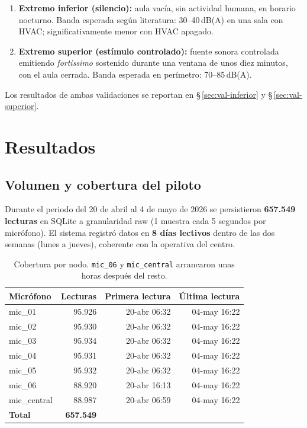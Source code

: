 \documentclass[11pt,a4paper,openany]{report}
\begin{document}
\begin{enumerate}
    \item \textbf{Extremo inferior (silencio):} aula vac\'ia, sin actividad humana, en horario nocturno. Banda esperada seg\'un literatura: 30--40\,dB(A) en una sala con HVAC; significativamente menor con HVAC apagado.
    \item \textbf{Extremo superior (est\'imulo controlado):} fuente sonora controlada emitiendo \emph{fortissimo} sostenido durante una ventana de unos diez minutos, con el aula cerrada. Banda esperada en perímetro: 70--85\,dB(A).
\end{enumerate}

Los resultados de ambas validaciones se reportan en \S\,\ref{sec:val-inferior} y \S\,\ref{sec:val-superior}.

\chapter{Resultados}
\label{cap:resultados}

\section{Volumen y cobertura del piloto}

Durante el periodo del 20 de abril al 4 de mayo de 2026 se persistieron \textbf{657.549 lecturas} en SQLite a granularidad raw (1 muestra cada 5 segundos por micr\'ofono). El sistema registr\'o datos en \textbf{8 d\'ias lectivos} dentro de las dos semanas (lunes a jueves), coherente con la operativa del centro.

\begin{table}[H]
\centering
{}
\begin{tabularx}{\textwidth}{l r r r}
\toprule
\rowcolor{TableHead}
\textbf{Micr\'ofono} & \textbf{Lecturas} & \textbf{Primera lectura} & \textbf{\'Ultima lectura} \\ \midrule
mic\_01      & 95.926 & 20-abr 06:32 & 04-may 16:22 \\
mic\_02      & 95.930 & 20-abr 06:32 & 04-may 16:22 \\
mic\_03      & 95.934 & 20-abr 06:32 & 04-may 16:22 \\
mic\_04      & 95.931 & 20-abr 06:32 & 04-may 16:22 \\
mic\_05      & 95.932 & 20-abr 06:32 & 04-may 16:22 \\
mic\_06      &  88.920 & 20-abr 16:13 & 04-may 16:22 \\
mic\_central &  88.987 & 20-abr 06:59 & 04-may 16:22 \\
\midrule
\textbf{Total} & \textbf{657.549} & & \\ \bottomrule
\end{tabularx}
\caption{Cobertura por nodo. \texttt{mic\_06} y \texttt{mic\_central} arrancaron unas horas despu\'es del resto.}
\end{table}
\end{document}
